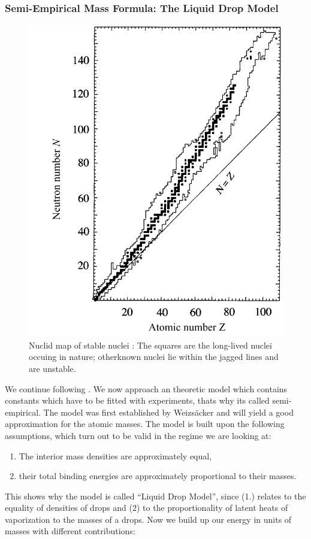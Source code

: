 \subsubsection{Semi-Empirical Mass Formula: The Liquid Drop Model}
\begin{figure}[htpb]
    \centering
    \includegraphics[width=0.6\linewidth]{figures/nuclidmap}
    \caption{Nuclid map of stable nuclei \cite{Hooshyar}: The squares are the long-lived nuclei
    occuing in nature; otherknown nuclei lie within the jagged lines and are unstable.}
    \label{fig:nuclidmap}
\end{figure}
\label{ssub:Semi-Empirical Mass Formula: The Liquid Drop Model}
We continue following \cite{Hooshyar}. We now approach an theoretic model which contains constants which
have to be fitted with experiments, thats why its called semi-empirical. 
The model was first established by Weizsäcker and will yield a 
good approximation for the atomic masses. The model is built upon the following assumptions, which turn
out to be valid in the regime we are looking at:
\begin{enumerate}
    \item The interior mass densities are approximately equal,
    \item their total binding energies are approximately proportional to their masses.
\end{enumerate}
This shows why the model is called ``Liquid Drop Model'', since (1.) relates to the equality of densities
of drops and (2) to the proportionality of latent heats of vaporization to the masses of a drops. 
Now we build up our energy in units of masses with different contributions:
